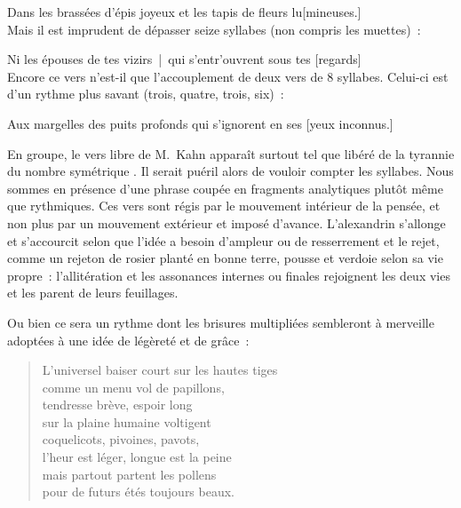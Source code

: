 \documentclass[french,twoside]{book} %
\newcommand{\bibl}[1]{{\RaggedLeft{#1}\par\bigskip}}
\newenvironment{quoteblock}%
  {\begin{quoting}}
  {\end{quoting}}
\newenvironment{quotebar}{%
    \def\FrameCommand{{\color{rubric!10!}\vrule width 0.5em} \hspace{0.9em}}%
    \def\OuterFrameSep{\itemsep} %
    \MakeFramed {\advance\hsize-\width \FrameRestore}
  }%
  {%
    \endMakeFramed
  }
\renewenvironment{quoteblock}%
  {%
    \savenotes
    \setstretch{0.9}
    \normalfont
    \begin{quotebar}
  }
  {%
    \end{quotebar}
    \spewnotes
  }
\begin{document}
Dans les brassées d’épis joyeux et les tapis de fleurs lu[mineuses.]\\

\noindent Mais il est imprudent de dépasser seize syllabes (non compris les muettes) :\par

Ni les épouses de tes vizirs | qui s’entr’ouvrent sous tes [regards]\\

\noindent Encore ce vers n’est-il que l’accouplement de deux vers de 8 syllabes. Celui-ci est d’un rythme plus savant (trois, quatre, trois, six) :\par

Aux margelles des puits profonds qui s’ignorent en ses [yeux inconnus.]\\
\begin{quoteblock}

\bibl{({\itshape Chansons d’amant})}
\end{quoteblock}

\noindent En groupe, le vers libre de M. Kahn apparaît surtout tel que libéré de la tyrannie du nombre symétrique . Il serait puéril alors de vouloir compter les syllabes. Nous sommes en présence d’une phrase coupée en fragments analytiques plutôt même que rythmiques. Ces vers sont régis par le mouvement intérieur de la pensée, et non plus par un mouvement extérieur et imposé d’avance. L’alexandrin s’allonge et s’accourcit selon que l’idée a besoin d’ampleur ou de resserrement et le rejet, comme un rejeton de rosier planté en bonne terre, pousse et verdoie selon sa vie propre : l’allitération et les assonances internes ou finales rejoignent les deux vies et les parent de leurs feuillages.\par
Ou bien ce sera un rythme dont les brisures multipliées sembleront à merveille adoptées à une idée de légèreté et de grâce :\par


\begin{verse}
L’universel baiser court sur les hautes tiges\\
comme un menu vol de papillons,\\
tendresse brève, espoir long\\
sur la plaine humaine voltigent\\
coquelicots, pivoines, pavots,\\
l’heur est léger, longue est la peine\\
mais partout partent les pollens\\
pour de futurs étés toujours beaux.\\
\end{verse}
\end{document}

